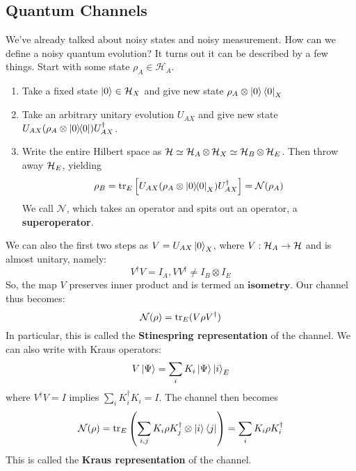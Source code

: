 \subsection{Quantum Channels}
We've already talked about noisy states and noisy measurement. How can we define a noisy quantum evolution? It turns out it can be described by a few things. Start with
some state $\rho_A \in \mathcal{H}_A$.
\begin{enumerate}
    \item Take a fixed state $\ket{0} \in \mathcal{H}_X$ and give new state $\rho_A \otimes \ket{0}\bra{0}_X$
    \item Take an arbitrary unitary evolution $U_{AX}$ and give new state $U_{AX}\qty(\rho_A \otimes \ketbra{0}) U_{AX}^{\dagger}$.
    \item Write the entire Hilbert space as $\operatorname{\mathcal{H}} \simeq \operatorname{\mathcal{H}}_A \otimes \operatorname{\mathcal{H}}_X \simeq \operatorname{\mathcal{H}}_B \otimes \operatorname{\mathcal{H}}_E$. Then throw away $\operatorname{\mathcal{H}}_E$, yielding
    \[ \rho_B = \tr_E\qty[U_{AX} (\rho_A \otimes \ketbra{0}_X) U_{AX}^{\dagger}] = \mathcal{N}(\rho_A) \]
    We call $\mathcal{N}$, which takes an operator and spits out an operator, a \textbf{superoperator}.
\end{enumerate}
We can also the first two steps as $V = U_{AX} \ket{0}_X$, where $V: \operatorname{\mathcal{H}}_A \to \operatorname{\mathcal{H}}$ and is almost unitary, namely:
\[ V^{\dagger} V = I_A, VV^{\dagger} \neq I_B \otimes I_E \]
So, the map $V$ preserves inner product and is termed an $\textbf{isometry}$. Our channel thus becomes:
\[ \mathcal{N}(\rho) = \tr_E(V \rho V^{\dagger}) \]
In particular, this is called the \textbf{Stinespring representation} of the channel. We can also write with Kraus operators:
\[ V \ket{\Psi}  = \sum_i K_i \ket{\Psi} \ket{i}_E \]
where $V^{\dagger}V = I$ implies $\sum_i K_i^{\dagger} K_i = I$. The channel then becomes
\[ \mathcal{N}(\rho) = \tr_E\qty(\sum_{i, j} K_i \rho K_j^{\dagger} \otimes \ket{i}\bra{j}) = \sum_i K_i \rho K_i^{\dagger} \]
This is called the \textbf{Kraus representation} of the channel.

